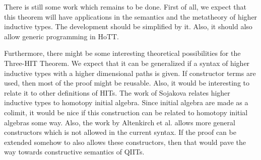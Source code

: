 \documentclass[a4paper,UKenglish]{lipics-v2016}
\begin{document}
There is still some work which remains to be done.
First of all, we expect that this theorem will have applications in the semantics and the metatheory of higher inductive types.
The development should be simplified by it.
Also, it should also allow generic programming in HoTT.

Furthermore, there might be some interesting theoretical possibilities for the Three-HIT Theorem.
We expect that it can be generalized if a syntax of higher inductive types with a higher dimensional paths is given.
If constructor terms are used, then most of the proof might be reusable.
Also, it would be interesting to relate it to other definitions of HITs.
The work of Sojakova \cite{sojakova2015higher} relates higher inductive types to homotopy initial algebra.
Since initial algebra are made as a colimit, it would be nice if this construction can be related to homotopy initial algebras some way.
Also, the work by Altenkirch et al. \cite{altenkirch2016quotient} allows more general constructors which is not allowed in the current syntax.
If the proof can be extended somehow to also allows these constructors, then that would pave the way towards constructive semantics of QIITs.

\nocite{*}





\end{document}
